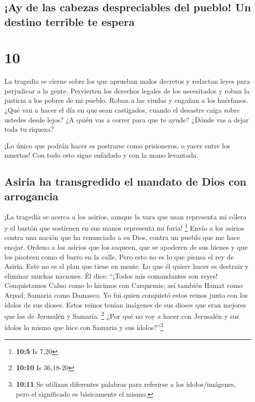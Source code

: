 \hypertarget{ay-de-las-cabezas-despreciables-del-pueblo-un-destino-terrible-te-espera}{%
\subsection{¡Ay de las cabezas despreciables del pueblo! Un destino
terrible te
espera}\label{ay-de-las-cabezas-despreciables-del-pueblo-un-destino-terrible-te-espera}}

\hypertarget{section-9}{%
\section{10}\label{section-9}}

 La tragedia se cierne sobre los que aprueban malos
decretos y redactan leyes para perjudicar a la gente. 
Pervierten los derechos legales de los necesitados y roban la justicia a
los pobres de mi pueblo. Roban a las viudas y engañan a los huérfanos.
 ¿Qué van a hacer el día en que sean castigados, cuando el
desastre caiga sobre ustedes desde lejos? ¿A quién vas a correr para que
te ayude? ¿Dónde vas a dejar toda tu riqueza?

 ¡Lo único que podrán hacer es postrarse como prisioneros,
o yacer entre los muertos! Con todo esto sigue enfadado y con la mano
levantada.

\hypertarget{asiria-ha-transgredido-el-mandato-de-dios-con-arrogancia}{%
\subsection{Asiria ha transgredido el mandato de Dios con
arrogancia}\label{asiria-ha-transgredido-el-mandato-de-dios-con-arrogancia}}

 ¡La tragedia se acerca a los asirios, aunque la vara que
usan representa mi cólera y el bastón que sostienen en sus manos
representa mi furia! \footnote{\textbf{10:5} Is 7,20} 
Envío a los asirios contra una nación que ha renunciado a su Dios,
contra un pueblo que me hace enojar. Ordeno a los asirios que los
saqueen, que se apoderen de sus bienes y que los pisoteen como el barro
en la calle.  Pero esto no es lo que piensa el rey de
Asiria. Este no es el plan que tiene en mente. Lo que él quiere hacer es
destruir y eliminar muchas naciones.  Él dice: ``¡Todos
mis comandantes son reyes!  Conquistamos Calno como lo
hicimos con Carquemis; así también Hamat como Arpad; Samaria como
Damasco.  Yo fui quien conquistó estos reinos junto con
los ídolos de sus dioses. Estos reinos tenían imágenes de sus dioses que
eran mejores que las de Jerusalén y Samaria. \footnote{\textbf{10:10} Is
  36,18-20}  ¿Por qué no voy a hacer con Jerusalén y sus
ídolos lo mismo que hice con Samaria y sus ídolos?''\footnote{\textbf{10:11}
  Se utilizan diferentes palabras para referirse a los ídolos/imágenes,
  pero el significado es básicamente el mismo.}

